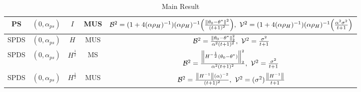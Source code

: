 \begin{table*}[t]
\begin{center}
{\begin{tabular}{|c|c|c|c|c|}
PS       & $(0,\alpha_{ps})$    &   $I$     & MUS        &   $\mathcal{B}^2=(1+4(\alpha\rho_H)^{-1}) (\alpha\rho_H)^{-1} \Big(\frac{\left\| \theta_0-\theta^*\right\|^2}{(t+1)^2}\Big),~\mathcal{V}^2=(1+4(\alpha\rho_H)^{-1}) (\alpha\rho_H)^{-1} \Big(\frac{\alpha^2\sigma^2}{t+1} \Big)$\\ \hline
SPDS    & $(0,\alpha_{ps})$     &   $H$     & MUS        &  $\mathcal{B}^2=\frac{\left\| \theta_0-\theta^*\right\|^2_2}{\alpha^2(t+1)^2},~\mathcal{V}^2=\frac{\sigma^2}{t+1}$\\ \hline
SPDS    & $(0,\alpha_{ps})$     &   $H^{\frac{1}{2}}$     & MS        &   $\mathcal{B}^2=\frac{\left\| H^{-\frac{1}{2}}(\theta_0-\theta^*)\right\|^2_2}{\alpha^2(t+1)^2},~\mathcal{V}^2=\frac{\sigma^2}{t+1}$\\ \hline
SPDS    & $(0,\alpha_{ps})$     &   $H^{\frac{1}{2}}$     & MUS        &   $\mathcal{B}^2=\frac{\left\| H^{-1}\right\|(\alpha)^{-2}}{(t+1)^2},~\mathcal{V}^2=(\sigma^2)\frac{\left\| H^{-1}\right\|}{t+1}$\\ \hline
\end{tabular}
}
\end{center}
\caption{Main Result}
\label{maintable}
\end{table*}
